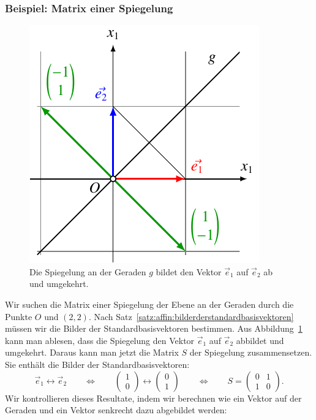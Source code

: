 \subsubsection{Beispiel: Matrix einer Spiegelung}
\begin{figure}
\centering
\includegraphics{3/images/spiegelung.pdf}
\caption{Die Spiegelung an der Geraden $g$ bildet den Vektor
$\vec{e}_1$ auf $\vec{e}_2$ ab und umgekehrt.
\label{skript:affin:spiegelung}}
\end{figure}
Wir suchen die Matrix einer Spiegelung der Ebene an der Geraden durch
die Punkte $O$ und $(2,2)$.
Nach Satz~\ref{satz:affin:bilderderstandardbasisvektoren} müssen wir 
die Bilder der Standardbasisvektoren bestimmen.
Aus Abbildung~\ref{skript:affin:spiegelung} kann man ablesen, dass die
Spiegelung den Vektor $\vec{e}_1$ auf $\vec{e}_2$ abbildet und umgekehrt.
Daraus kann man jetzt die Matrix $S$ der Spiegelung zusammensetzen.
Sie enthält die Bilder der Standardbasisvektoren:
\[
\vec{e}_1\leftrightarrow\vec{e}_2
\qquad\Leftrightarrow\qquad
\begin{pmatrix}1\\0\end{pmatrix}
\leftrightarrow
\begin{pmatrix}0\\1\end{pmatrix}
\qquad\Leftrightarrow\qquad
S
=
\begin{pmatrix}0&1\\1&0\end{pmatrix}.
\]
Wir kontrollieren dieses Resultate, indem wir berechnen wie ein Vektor
auf der Geraden und ein Vektor senkrecht dazu abgebildet werden:
